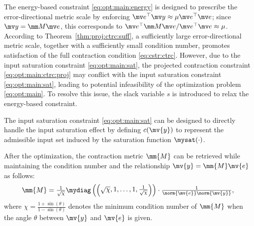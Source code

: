 \documentclass[lettersize,journal]{IEEEtran}
\begin{document}
The energy-based constraint \eqref{eq:opt:main:energy} is designed to prescribe the error-directional metric scale by enforcing 
$\mv e^\top\mv y\approx\mu\mv e^\top\mv e$; since $\mv y=\mm M\mv e$, this corresponds to 
$\mv e^\top\mm M\mv e/\mv e^\top\mv e\approx\mu$.
According to Theorem~\ref{thm:proj:ctrc:suff}, a sufficiently large error-directional metric scale, together with a sufficiently small condition number, promotes satisfaction of the full contraction condition \eqref{eq:cstr:ctrc}.
However, due to the input saturation constraint \eqref{eq:opt:main:sat}, the projected contraction constraint \eqref{eq:opt:main:ctrc:proj} may conflict with the input saturation constraint \eqref{eq:opt:main:sat}, leading to potential infeasibility of the optimization problem \eqref{eq:opt:main}.
To resolve this issue, the slack variable $s$ is introduced to relax the energy-based constraint.

The input saturation constraint \eqref{eq:opt:main:sat} can be designed to directly handle the input saturation effect by defining $c(\mv{y})$ to represent the admissible input set induced by the saturation function $\mysat(\cdot)$.

After the optimization, the contraction metric $\mm{M}$ can be retrieved while maintaining the condition number and the relationship $\mv{y}=\mm{M}\mv{e}$ as follows:
\begin{equation} \label{eq:retrive:mm}
   \mm{M}
   =
   \tfrac{1}{\sqrt{\chi}}
   \mydiag
   \left(
      \begin{pmatrix}
         \sqrt{\chi}, 1, \ldots, 1, \tfrac{1}{\sqrt{\chi}}
      \end{pmatrix}
   \right)
   \cdot
   \tfrac{1}{\norm{\mv{e}}\norm{\mv{y}}}
   ,
\end{equation}
where $\chi=\tfrac{1+\sin(\theta)}{1-\sin(\theta)}$ denotes the minimum condition number of $\mm{M}$ when the angle $\theta$ between $\mv{y}$ and $\mv{e}$ is given.

\end{document}
